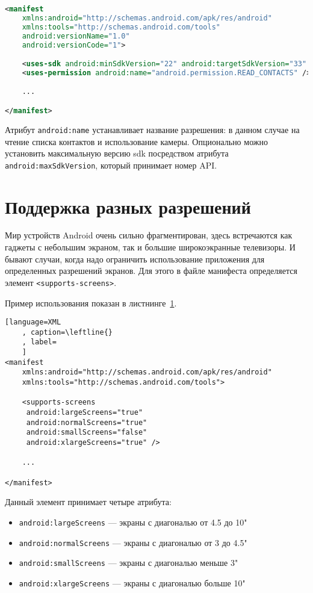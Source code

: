 \begin{lstlisting}[language=XML
	, caption=\leftline{}
	, label=lst:permission
	]
<manifest
    xmlns:android="http://schemas.android.com/apk/res/android"
    xmlns:tools="http://schemas.android.com/tools"
    android:versionName="1.0"
    android:versionCode="1">

    <uses-sdk android:minSdkVersion="22" android:targetSdkVersion="33" />
    <uses-permission android:name="android.permission.READ_CONTACTS" />

	...

</manifest>
\end{lstlisting}

Атрибут \texttt{android:name} устанавливает название разрешения: в данном
случае на чтение списка контактов и использование камеры. Опционально можно
установить максимальную версию sdk посредством атрибута
\texttt{android:maxSdkVersion}, который принимает номер API.

\section{Поддержка разных разрешений}
Мир устройств Android очень сильно фрагментирован, здесь встречаются как
гаджеты с небольшим экраном, так и большие широкоэкранные телевизоры.
И бывают случаи, когда надо ограничить использование приложения для
определенных разрешений экранов. Для этого в файле манифеста
определяется элемент \texttt{<supports-screens>}.\par
Пример использования показан в листнинге~\ref{}.

\begin{lstlisting}[language=XML
	, caption=\leftline{}
	, label=
	]
<manifest
    xmlns:android="http://schemas.android.com/apk/res/android"
    xmlns:tools="http://schemas.android.com/tools">

	<supports-screens
	 android:largeScreens="true"
	 android:normalScreens="true"
	 android:smallScreens="false"
	 android:xlargeScreens="true" />

	...

</manifest>
\end{lstlisting}

Данный элемент принимает четыре атрибута:

\begin{itemize}
	\item \texttt{android:largeScreens} --- экраны с диагональю от 4.5 до 10"
	\item \texttt{android:normalScreens} --- экраны с диагональю от 3 до 4.5"
	\item \texttt{android:smallScreens} --- экраны с диагональю меньше 3"
	\item \texttt{android:xlargeScreens} --- экраны с диагональю больше 10"
\end{itemize}

